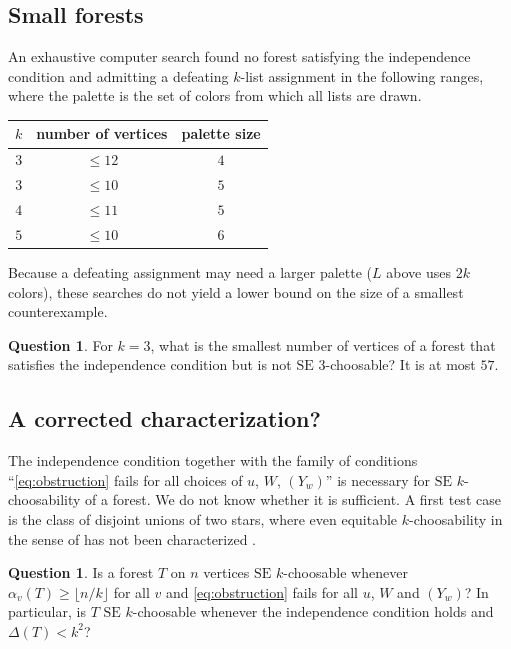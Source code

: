 \documentclass[11pt]{article}
\theoremstyle{definition}
\newtheorem{question}[theorem]{Question}
\newcommand{\SE}{\mathrm{SE}}
\begin{document}
\subsection*{Small forests}
An exhaustive computer search found no forest satisfying the independence condition and
admitting a defeating $k$-list assignment in the following ranges, where the palette is
the set of colors from which all lists are drawn.
\begin{center}
\begin{tabular}{@{}ccc@{}}
\toprule
$k$ & number of vertices & palette size\\
\midrule
$3$ & $\le 12$ & $4$\\
$3$ & $\le 10$ & $5$\\
$4$ & $\le 11$ & $5$\\
$5$ & $\le 10$ & $6$\\
\bottomrule
\end{tabular}
\end{center}
Because a defeating assignment may need a larger palette ($L$ above uses $2k$ colors),
these searches do not yield a lower bound on the size of a smallest counterexample.

\begin{question}
For $k=3$, what is the smallest number of vertices of a forest that satisfies the
independence condition but is not $\SE$ $3$-choosable? It is at most $57$.
\end{question}

\subsection*{A corrected characterization?}
The independence condition together with the family of conditions
``\eqref{eq:obstruction} fails for all choices of $u$, $W$, $(Y_w)$'' is necessary for
$\SE$ $k$-choosability of a forest. We do not know whether it is sufficient. A
first test case is the class of disjoint unions of two stars, where even equitable
$k$-choosability in the sense of \cite{KPW} has not been characterized \cite[Question~8]{KMW}.

\begin{question}
Is a forest $T$ on $n$ vertices $\SE$ $k$-choosable whenever $\alpha_v(T)\ge\lfloor n/k\rfloor$
for all $v$ and \eqref{eq:obstruction} fails for all $u$, $W$ and $(Y_w)$?
In particular, is $T$ $\SE$ $k$-choosable whenever the independence condition holds and
$\Delta(T)< k^2$?
\end{question}
\end{document}
